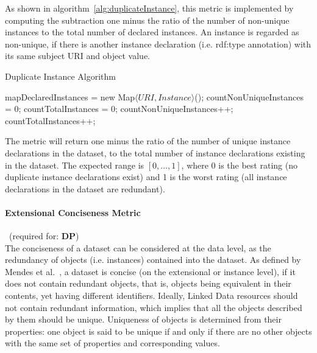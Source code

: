 As shown in algorithm~\ref{alg:duplicateInstance}, this metric is implemented by computing the subtraction one minus the ratio of the number of non-unique instances to the total number of declared instances. An instance is regarded as non-unique, if there is another instance declaration (i.e. rdf:type annotation) with its same subject URI and object value.
\begin{algorithm}
\caption{Duplicate Instance Algorithm} \label{alg:duplicateInstance}
\begin{algorithmic}[1]
\State mapDeclaredInstances = new Map$\langle URI, Instance\rangle$();
\State countNonUniqueInstances = 0;
\State countTotalInstances = 0;
\EndProcedure
{}
countNonUniqueInstances++; 
\EndIf
\State countTotalInstances++;  ~\\
\EndProcedure
\end{algorithmic}
\end{algorithm}
The metric will return one minus the ratio of the number of unique instance declarations in the dataset, to the total number of instance declarations existing in the dataset. The expected range is $[0,\ldots,1]$, where 0 is the best rating (no duplicate instance declarations exist) and 1 is the worst rating (all instance declarations in the dataset are redundant).


\paragraph{Extensional Conciseness Metric}~(required for: \textbf{DP})~\\ 
The conciseness of a dataset can be considered at the data level, as the redundancy of objects (i.e. instances) contained into the dataset. As defined by Mendes et al.~\cite{Mendes2012}, a dataset is concise (on the extensional or instance level), if it does not contain redundant objects, that is, objects being equivalent in their contents, yet having different identifiers.
Ideally, Linked Data resources should not contain redundant information, which implies that all the objects described by them should be unique. Uniqueness of objects is determined from their properties: one object is said to be unique if and only if there are no other objects with the same set of properties and corresponding values.

